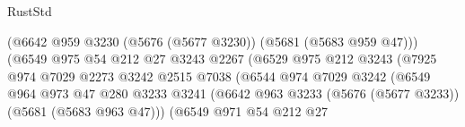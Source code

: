 \begin{lexlean}{RustStd}
\begin{coremodule}
                                              (@6642
                                                @959
                                                @3230
                                                (@5676 (@5677 @3230))
                                                (@5681 (@5683 @959 @47)))
                                              (@6549
                                                @975
                                                @54
                                                @212
                                                @27
                                                @3243
                                                @2267
                                                (@6529
                                                  @975
                                                  @212
                                                  @3243
                                                  (@7925
                                                    @974
                                                    @7029
                                                    @2273
                                                    @3242
                                                    @2515
                                                    @7038
                                                    (@6544
                                                      @974
                                                      @7029
                                                      @3242
                                                      (@6549
                                                        @964
                                                        @973
                                                        @47
                                                        @280
                                                        @3233
                                                        @3241
                                                        (@6642
                                                          @963
                                                          @3233
                                                          (@5676 (@5677 @3233))
                                                          (@5681 (@5683 @963 @47)))
                                                        (@6549
                                                          @971
                                                          @54
                                                          @212
                                                          @27

\end{coremodule}
\end{lexlean}
